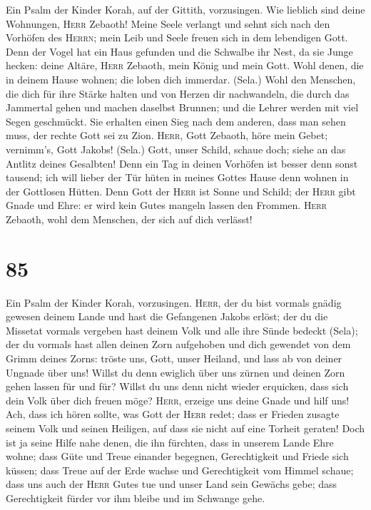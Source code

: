  Ein Psalm der Kinder Korah, auf der Gittith, vorzusingen.
 Wie lieblich sind deine Wohnungen, \textsc{Herr} Zebaoth!
 Meine Seele verlangt und sehnt sich nach den Vorhöfen des
\textsc{Herrn}; mein Leib und Seele freuen sich in dem lebendigen Gott.
 Denn der Vogel hat ein Haus gefunden und die Schwalbe ihr
Nest, da sie Junge hecken: deine Altäre, \textsc{Herr} Zebaoth, mein
König und mein Gott.  Wohl denen, die in deinem Hause
wohnen; die loben dich immerdar. (Sela.)  Wohl den
Menschen, die dich für ihre Stärke halten und von Herzen dir
nachwandeln,  die durch das Jammertal gehen und machen
daselbst Brunnen; und die Lehrer werden mit viel Segen geschmückt.
 Sie erhalten einen Sieg nach dem anderen, dass man sehen
muss, der rechte Gott sei zu Zion.  \textsc{Herr}, Gott
Zebaoth, höre mein Gebet; vernimm's, Gott Jakobs! (Sela.)
 Gott, unser Schild, schaue doch; siehe an das Antlitz
deines Gesalbten!  Denn ein Tag in deinen Vorhöfen ist
besser denn sonst tausend; ich will lieber der Tür hüten in meines
Gottes Hause denn wohnen in der Gottlosen Hütten.  Denn
Gott der \textsc{Herr} ist Sonne und Schild; der \textsc{Herr} gibt
Gnade und Ehre: er wird kein Gutes mangeln lassen den Frommen.
 \textsc{Herr} Zebaoth, wohl dem Menschen, der sich auf
dich verlässt!

\hypertarget{section-84}{%
\section{85}\label{section-84}}

 Ein Psalm der Kinder Korah, vorzusingen. 
\textsc{Herr}, der du bist vormals gnädig gewesen deinem Lande und hast
die Gefangenen Jakobs erlöst;  der du die Missetat vormals
vergeben hast deinem Volk und alle ihre Sünde bedeckt (Sela);
 der du vormals hast allen deinen Zorn aufgehoben und dich
gewendet von dem Grimm deines Zorns:  tröste uns, Gott,
unser Heiland, und lass ab von deiner Ungnade über uns! 
Willst du denn ewiglich über uns zürnen und deinen Zorn gehen lassen für
und für?  Willst du uns denn nicht wieder erquicken, dass
sich dein Volk über dich freuen möge?  \textsc{Herr},
erzeige uns deine Gnade und hilf uns!  Ach, dass ich hören
sollte, was Gott der \textsc{Herr} redet; dass er Frieden zusagte seinem
Volk und seinen Heiligen, auf dass sie nicht auf eine Torheit geraten!
 Doch ist ja seine Hilfe nahe denen, die ihn fürchten,
dass in unserem Lande Ehre wohne;  dass Güte und Treue
einander begegnen, Gerechtigkeit und Friede sich küssen; 
dass Treue auf der Erde wachse und Gerechtigkeit vom Himmel schaue;
 dass uns auch der \textsc{Herr} Gutes tue und unser Land
sein Gewächs gebe;  dass Gerechtigkeit fürder vor ihm
bleibe und im Schwange gehe.

